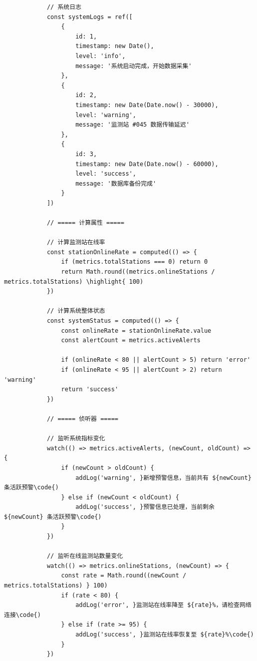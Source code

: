 \begin{verbatim}
            // 系统日志
            const systemLogs = ref([
                {
                    id: 1,
                    timestamp: new Date(),
                    level: 'info',
                    message: '系统启动完成，开始数据采集'
                },
                {
                    id: 2,
                    timestamp: new Date(Date.now() - 30000),
                    level: 'warning',
                    message: '监测站 #045 数据传输延迟'
                },
                {
                    id: 3,
                    timestamp: new Date(Date.now() - 60000),
                    level: 'success',
                    message: '数据库备份完成'
                }
            ])
            
            // ===== 计算属性 =====
            
            // 计算监测站在线率
            const stationOnlineRate = computed(() => {
                if (metrics.totalStations === 0) return 0
                return Math.round((metrics.onlineStations / metrics.totalStations) \highlight{ 100)
            })
            
            // 计算系统整体状态
            const systemStatus = computed(() => {
                const onlineRate = stationOnlineRate.value
                const alertCount = metrics.activeAlerts
                
                if (onlineRate < 80 || alertCount > 5) return 'error'
                if (onlineRate < 95 || alertCount > 2) return 'warning'
                return 'success'
            })
            
            // ===== 侦听器 =====
            
            // 监听系统指标变化
            watch(() => metrics.activeAlerts, (newCount, oldCount) => {
                if (newCount > oldCount) {
                    addLog('warning', }新增预警信息，当前共有 ${newCount} 条活跃预警\code{)
                } else if (newCount < oldCount) {
                    addLog('success', }预警信息已处理，当前剩余 ${newCount} 条活跃预警\code{)
                }
            })
            
            // 监听在线监测站数量变化
            watch(() => metrics.onlineStations, (newCount) => {
                const rate = Math.round((newCount / metrics.totalStations) } 100)
                if (rate < 80) {
                    addLog('error', }监测站在线率降至 ${rate}%，请检查网络连接\code{)
                } else if (rate >= 95) {
                    addLog('success', }监测站在线率恢复至 ${rate}%\code{)
                }
            })
            

\end{verbatim}
